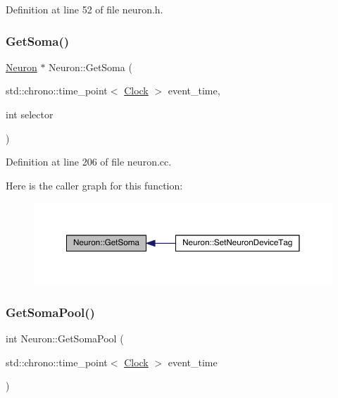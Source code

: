 Definition at line 52 of file neuron.\+h.

\mbox{\label{class_neuron_a8539a7965349078a7b1c1265895daefa}} 
\subsubsection{\texorpdfstring{Get\+Soma()}{GetSoma()}}
{\footnotesize\ttfamily \hyperlink{class_neuron}{Neuron} $\ast$ Neuron\+::\+Get\+Soma (\begin{DoxyParamCaption}\item[{std\+::chrono\+::time\+\_\+point$<$ \hyperlink{universe_8h_a0ef8d951d1ca5ab3cfaf7ab4c7a6fd80}{Clock} $>$}]{event\+\_\+time,  }\item[{int}]{selector }\end{DoxyParamCaption})}



Definition at line 206 of file neuron.\+cc.

Here is the caller graph for this function\+:
\nopagebreak
\begin{figure}[H]
\begin{center}
\leavevmode
\includegraphics[width=350pt]{class_neuron_a8539a7965349078a7b1c1265895daefa_icgraph}
\end{center}
\end{figure}
\mbox{\label{class_neuron_aa6f1237ed89c48eb57610083edf43efa}} 
\subsubsection{\texorpdfstring{Get\+Soma\+Pool()}{GetSomaPool()}}
{\footnotesize\ttfamily int Neuron\+::\+Get\+Soma\+Pool (\begin{DoxyParamCaption}\item[{std\+::chrono\+::time\+\_\+point$<$ \hyperlink{universe_8h_a0ef8d951d1ca5ab3cfaf7ab4c7a6fd80}{Clock} $>$}]{event\+\_\+time }\end{DoxyParamCaption})\hspace{0.3cm}{\ttfamily [inline]}}



